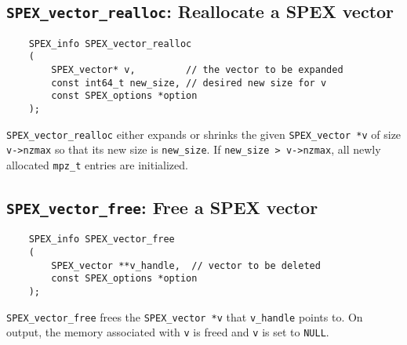 \documentclass[12pt,oneside]{book}
\theoremstyle{definition}
\begin{document}
{\subsection{\texttt{SPEX\_vector\_realloc}: Reallocate a SPEX vector} \label{ss:spex_vector_realloc}
\begin{mdframed}[userdefinedwidth=\textwidth]
{\footnotesize
\begin{verbatim}
    SPEX_info SPEX_vector_realloc
    (
        SPEX_vector* v,         // the vector to be expanded
        const int64_t new_size, // desired new size for v
        const SPEX_options *option
    ); 
\end{verbatim}
} \end{mdframed}

\verb|SPEX_vector_realloc| either expands or shrinks the given \verb|SPEX_vector *v| of size \verb|v->nzmax| so that its new size is \verb|new_size|. If \verb|new_size > v->nzmax|, all newly allocated \verb|mpz_t| entries are initialized.

\subsection{\texttt{SPEX\_vector\_free}: Free a SPEX vector} \label{ss:spex_vector_free}
\begin{mdframed}[userdefinedwidth=\textwidth]
{\footnotesize
\begin{verbatim}
    SPEX_info SPEX_vector_free
    (
        SPEX_vector **v_handle,  // vector to be deleted
        const SPEX_options *option
    ); 
\end{verbatim}
} \end{mdframed}

\verb|SPEX_vector_free| frees the \verb|SPEX_vector *v| that \verb|v_handle| points to. On output, the memory associated with \verb|v| is freed and \verb|v| is set to \verb|NULL|.
}

\newpage
\end{document}
